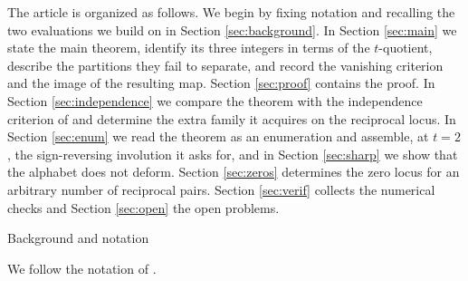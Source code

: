 \documentclass[11pt,reqno]{amsart}
\makeatletter
\renewcommand\section{\@startsection{section}{1}%
  \z@{\linespacing\@plus\linespacing}{.5\linespacing}%
  {\normalfont\large\bfseries\centering}}
\theoremstyle{plain}
\theoremstyle{definition}
\makeatother
\begin{document}
The article is organized as follows. We begin by fixing notation and recalling the two evaluations we
build on in Section \ref{sec:background}. In Section \ref{sec:main} we state the main theorem,
identify its three integers in terms of the $t$-quotient, describe the partitions they fail to
separate, and record the vanishing criterion and the image of the resulting map. Section \ref{sec:proof} contains the proof. In Section
\ref{sec:independence} we compare the theorem with the independence criterion of \cite{AK25} and
determine the extra family it acquires on the reciprocal locus. In Section \ref{sec:enum} we read the
theorem as an enumeration and assemble, at $t=2$, the sign-reversing involution it asks for,
and in Section \ref{sec:sharp} we show that the alphabet does not deform.
Section \ref{sec:zeros} determines the zero locus for an arbitrary number of reciprocal pairs.
Section \ref{sec:verif} collects the numerical checks and Section \ref{sec:open} the open problems.

\section{Background and notation}\label{sec:background}

We follow the notation of \cite{AK22,AK25}.
\end{document}
